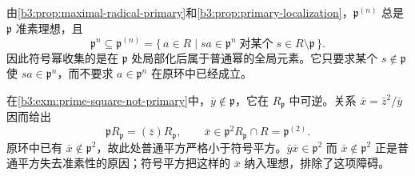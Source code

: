 由\cref{b3:prop:maximal-radical-primary}和\cref{b3:prop:primary-localization}，\(\mathfrak p^{(n)}\) 总是 \(\mathfrak p\) 准素理想，且
\[
	\mathfrak p^n\subseteq\mathfrak p^{(n)} =\{\,a\in R\mid sa\in\mathfrak p^n\;\text{对某个}\;s\in R\setminus\mathfrak p\,\}.
\]
因此符号幂收集的是在 \(\mathfrak p\) 处局部化后属于普通幂的全局元素。它只要求某个 \(s\notin\mathfrak p\) 使 \(sa\in\mathfrak p^n\)，而不要求 \(a\in\mathfrak p^n\) 在原环中已经成立。

\ProseParagraphBreak
在\cref{b3:exm:prime-square-not-primary}中，\(\bar y\notin\mathfrak p\)，它在 \(R_{\mathfrak p}\) 中可逆。关系 \(\bar x=\bar z^2/\bar y\) 因而给出
\[
	\mathfrak pR_{\mathfrak p}=(\bar z)R_{\mathfrak p}, \qquad \bar x\in\mathfrak p^2R_{\mathfrak p}\cap R=\mathfrak p^{(2)}.
\]
原环中已有 \(\bar x\notin\mathfrak p^2\)，故此处普通平方严格小于符号平方。\(\bar y\bar x\in\mathfrak p^2\) 而 \(\bar x\notin\mathfrak p^2\) 正是普通平方失去准素性的原因；符号平方把这样的 \(\bar x\) 纳入理想，排除了这项障碍。
